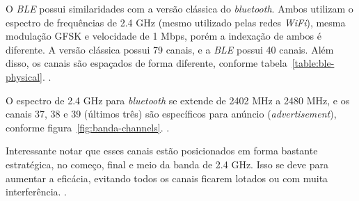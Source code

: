 \documentclass[
	12pt,				%
	openright,			%
	oneside,			%
	a4paper,			%
	chapter=TITLE,		%
	english,			%
	brazil				%
	]{abntex2}
\begin{document}
{O \textit{BLE} possui similaridades com a versão clássica do \textit{bluetooth}. Ambos utilizam o espectro de frequências de 2.4 GHz (mesmo utilizado pelas redes \textit{WiFi}), mesma modulação GFSK e velocidade de 1 Mbps, porém a indexação de ambos é diferente. A versão clássica possui 79 canais, e a \textit{BLE} possui 40 canais. Além disso, os canais são espaçados de forma diferente, conforme tabela~\ref{table:ble-physical}. \cite{ble-packets}.

\begin{table}[htb]
\end{table}

O espectro de 2.4 GHz para \textit{bluetooth} se extende de 2402 MHz a 2480 MHz, e os canais 37, 38 e 39 (últimos três) são específicos para anúncio (\textit{advertisement}), conforme figura~\ref{fig:banda-channels}.  \cite{ble-packets}. 

\begin{figure}[h!]
\end{figure}

Interessante notar que esses canais estão posicionados em forma bastante estratégica, no começo, final e meio da banda de 2.4 GHz. Isso se deve para aumentar a eficácia, evitando todos os canais ficarem lotados ou com muita interferência. \cite{ble-packets}. 

}
\end{document}

